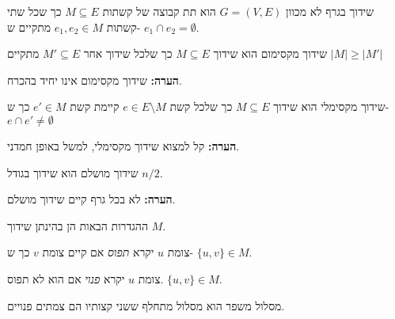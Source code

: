 \begin{definition}[שידוך]
שידוך בגרף לא מכוון
$G = (V, E)$
הוא תת קבוצה של קשתות 
$M \subseteq E$
כך שכל שתי קשתות
$e_1, e_2 \in M$
מתקיים ש-
$e_1 \cap e_2 = \emptyset$.
\end{definition}

\begin{definition}
שידוך מקסימום הוא שידוך 
$M \subseteq E$
כך שלכל שידוך אחר
$M' \subseteq E$
מתקיים
$|M| \geq |M'|$
\end{definition}

\textbf{הערה:}
שידוך מקסימום אינו יחיד בהכרח.

\begin{definition}
שידוך מקסימלי הוא שידוך 
$M \subseteq E$
כך שלכל קשת 
$e \in E \setminus M$
קיימת קשת 
$e' \in M$
כך ש-
$e \cap e' \neq \emptyset$
\end{definition}

\textbf{הערה:}
קל למצוא שידוך מקסימלי, למשל באופן חמדני.

\begin{definition}
שידוך מושלם הוא שידוך בגודל 
$n/2$.
\end{definition}
\textbf{הערה:}
לא בכל גרף קיים שידוך מושלם.

ההגדרות הבאות הן בהינתן שידוך $M$.
\begin{definition}
צומת $u$ יקרא
\emph{תפוס}
אם קיים צומת $v$ כך ש-
$\{u, v\} \in M$.
\end{definition}

\begin{definition}
צומת $u$ יקרא
\emph{פנוי}
אם הוא לא תפוס.
$\{u, v\} \in M$.
\end{definition}

\begin{definition}[מסלול מתחלף]
מסלול (פשוט) 
$(v_1, \ldots, v_l)$
יקרא
\emph{מתחלף}
אם לכל 
$1 \leq i < l$
מתקיים ש-
$|\{e_i, e_{i + 1}}\} \cap M| = 1$
כאשר
$e_i = \{v_i, v_{i + 1}\}$.
\end{definition}

\begin{definition}
מסלול משפר הוא מסלול מתחלף ששני קצותיו הם צמתים פנויים.
\end{definition}

\begin{figure}[h]
\centering

\end{figure}
